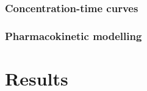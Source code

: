 \subsubsection{Concentration-time curves}

\subsubsection{Pharmacokinetic modelling}



\section{Results}








